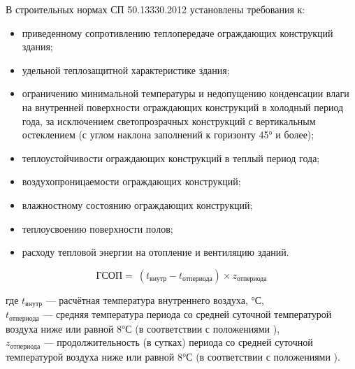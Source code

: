 В строительных нормах СП 50.13330.2012 \cite{law_RU_Rules_Code_ThermalPerformance} установлены требования к:
\begin{itemize}
    \item приведенному сопротивлению теплопередаче ограждающих конструкций здания;
    \item удельной теплозащитной характеристике здания;
    \item ограничению минимальной температуры и недопущению конденсации влаги на внутренней поверхности ограждающих конструкций в холодный период года, за исключением светопрозрачных конструкций с вертикальным остеклением (с углом наклона заполнений к горизонту 45° и более);
    \item теплоустойчивости ограждающих конструкций в теплый период года;
    \item воздухопроницаемости ограждающих конструкций;
    \item влажностному состоянию ограждающих конструкций;
    \item теплоусвоению поверхности полов;
    \item расходу тепловой энергии на отопление и вентиляцию зданий.
\end{itemize}



\begin{eqndesc}
    \begin{equation}\label{eq:gsop}
        \text{ГСОП}=\ (t_{\text{внутр}}-t_{\text{отпериода}})\times z_{\text{отпериода}}
    \end{equation}

    где $t_{\text{внутр}}$ — расчётная температура внутреннего воздуха, °С,\\
    $t_{\text{отпериода}}$ — средняя температура периода со средней суточной температурой воздуха ниже или равной 8°С (в соответствии с положениями \cite{law_RU_RulesCode_BuildingClimatology}),\\
    $z_{\text{отпериода}}$ — продолжительность (в сутках) периода со средней суточной температурой воздуха ниже или равной 8°С (в соответствии с положениями \cite{law_RU_RulesCode_BuildingClimatology}).
\end{eqndesc}

